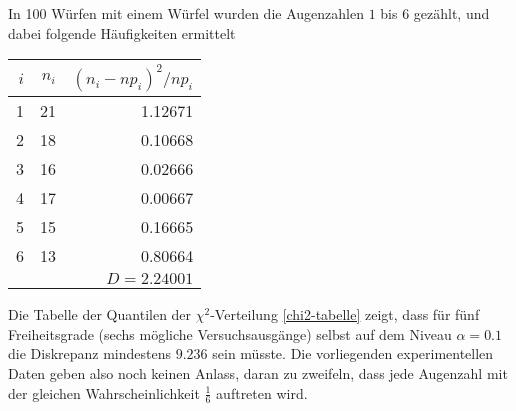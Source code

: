In 100 Würfen mit einem Würfel wurden die Augenzahlen $1$ bis $6$ gezählt,
und dabei folgende Häufigkeiten ermittelt
\begin{center}
\begin{tabular}{|r|r|r|}
\hline
$i$&$n_i$&$(n_i-np_i)^2/np_i$\\
\hline
1&21&1.12671\\
2&18&0.10668\\
3&16&0.02666\\
4&17&0.00667\\
5&15&0.16665\\
6&13&0.80664\\
\hline
&&$D=2.24001$\\
\hline
\end{tabular}
\end{center}
Die Tabelle der Quantilen der $\chi^2$-Verteilung \ref{chi2-tabelle}
zeigt, dass für fünf Freiheitsgrade (sechs mögliche Versuchsausgänge)
selbst auf dem Niveau $\alpha=0.1$ die Diskrepanz mindestens $9.236$ sein
müsste.
Die vorliegenden experimentellen Daten geben also noch keinen
Anlass, daran zu zweifeln, dass jede Augenzahl mit der gleichen
Wahrscheinlichkeit $\frac16$ auftreten wird.

